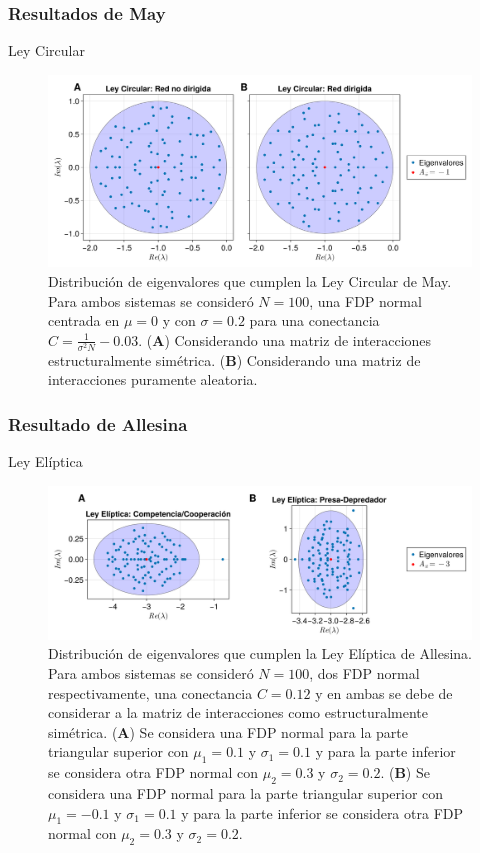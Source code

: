 \documentclass[10pt]{beamer}
\begin{document}
\begin{frame}
  \frametitle{Resultados de May}
  Ley Circular
  \begin{figure}[h!]
  	\centering
  	\includegraphics[scale=0.13]{../Texto/Imagenes/LeyCircularMay}
  	\caption{Distribución de eigenvalores que cumplen la Ley Circular de May. Para ambos sistemas se consideró $N=100$, una FDP normal centrada en $\mu=0$ y con $\sigma=0.2$ para una conectancia $C=\frac{1}{\sigma^2 N}-0.03$. (\textbf{A}) Considerando una matriz de interacciones estructuralmente simétrica. (\textbf{B}) Considerando una matriz de interacciones puramente aleatoria.}
  	\label{fig:LeyCircularMay}
  \end{figure}
\end{frame}
\begin{frame}
  \frametitle{Resultado de Allesina}
  Ley Elíptica
  \begin{figure}[h!]
  	\centering
  	\includegraphics[scale=0.10]{../Texto/Imagenes/LeyElipticaAllesina}
  	\caption{Distribución de eigenvalores que cumplen la Ley Elíptica de Allesina. Para ambos sistemas se consideró $N=100$, dos FDP normal respectivamente, una conectancia $C=0.12$ y en ambas se debe de considerar a la matriz de interacciones como estructuralmente simétrica. (\textbf{A}) Se considera una FDP normal para la parte triangular superior con $\mu_1=0.1$ y $\sigma_1 = 0.1$ y para la parte inferior se considera otra FDP normal con $\mu_2=0.3$ y $\sigma_2 = 0.2$. (\textbf{B}) Se considera una FDP normal para la parte triangular superior con $\mu_1=-0.1$ y $\sigma_1=0.1$ y para la parte inferior se considera otra FDP normal con $\mu_2=0.3$ y $\sigma_2=0.2$. }
  	\label{fig:LeyElipticaAllesina}
  \end{figure}
\end{frame}
\end{document}
